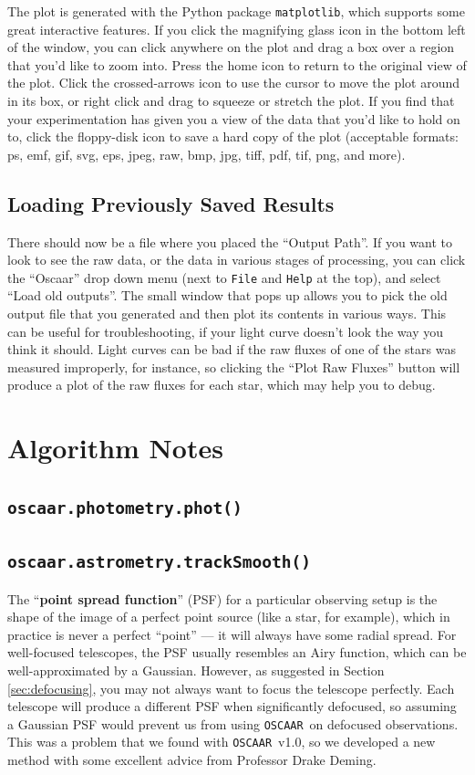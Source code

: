 \documentclass[a4paper]{article}
\newcommand{\code}[1]{\texttt{#1}}
\newcommand{\oscaar}{\code{OSCAAR}~}
\begin{document}
The plot is generated with the Python package \code{matplotlib}, which supports some great interactive features. If you click the magnifying glass icon in the bottom left of the window, you can click anywhere on the plot and drag a box over a region that you'd like to zoom into. Press the home icon to return to the original view of the plot. Click the crossed-arrows icon to use the cursor to move the plot around in its box, or right click and drag to squeeze or stretch the plot. If you find that your experimentation has given you a view of the data that you'd like to hold on to, click the floppy-disk icon to save a hard copy of the plot (acceptable formats: ps, emf, gif, svg, eps, jpeg, raw, bmp, jpg, tiff, pdf, tif, png, and more). 


\subsection{Loading Previously Saved Results}
There should now be a file where you placed the ``Output Path''. If you want to look to see the raw data, or the data in various stages of processing, you can click the ``Oscaar'' drop down menu (next to \code{File} and \code{Help} at the top), and select ``Load old outputs''. The small window that pops up allows you to pick the old output file that you generated and then plot its contents in various ways. This can be useful for troubleshooting, if your light curve doesn't look the way you think it should. Light curves can be bad if the raw fluxes of one of the stars was measured improperly, for instance, so clicking the ``Plot Raw Fluxes'' button will produce a plot of the raw fluxes for each star, which may help you to debug. 


\section{Algorithm Notes} \label{sec:algorithmNotes}
\subsection{\code{oscaar.photometry.phot()}}


\subsection{\code{oscaar.astrometry.trackSmooth()}} \label{sec:trackSmooth}
The ``\textbf{point spread function}'' (PSF) for a particular observing setup is the shape of the image of a perfect point source (like a star, for example), which in practice is never a perfect ``point'' --- it will always have some radial spread. For well-focused telescopes, the PSF usually resembles an Airy function, which can be well-approximated by a Gaussian. However, as suggested in Section \ref{sec:defocusing}, you may not always want to focus the telescope perfectly. Each telescope will produce a different PSF when significantly defocused, so assuming a Gaussian PSF would prevent us from using \oscaar on defocused observations. This was a problem that we found with \oscaar v1.0, so we developed a new method with some excellent advice from Professor Drake Deming.
\end{document}
